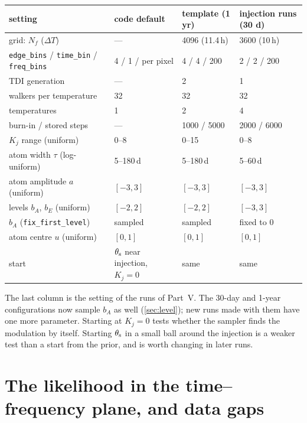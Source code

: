 \documentclass[11pt,a4paper]{article}
\begin{document}
\begin{center}
\renewcommand{\arraystretch}{1.15}
\footnotesize
\begin{tabular}{@{}llll@{}}
\toprule
setting & code default & template (1 yr) & injection runs (30 d) \\
\midrule
grid: $N_f$ ($\Delta T$) & --- & 4096 (11.4\,h) & 3600 (10\,h) \\
\texttt{edge\_bins} / \texttt{time\_bin} / \texttt{freq\_bins} & 4 / 1 / per pixel & 4 / 4 / 200 & 2 / 2 / 200 \\
TDI generation & --- & 2 & 1 \\
walkers per temperature & 32 & 32 & 32 \\
temperatures & 1 & 2 & 4 \\
burn-in / stored steps & --- & 1000 / 5000 & 2000 / 6000 \\
$K_j$ range (uniform) & 0--8 & 0--15 & 0--8 \\
atom width $\tau$ (log-uniform) & 5--180\,d & 5--180\,d & 5--60\,d \\
atom amplitude $a$ (uniform) & $[-3,3]$ & $[-3,3]$ & $[-3,3]$ \\
levels $b_A$, $b_E$ (uniform) & $[-2,2]$ & $[-2,2]$ & $[-3,3]$ \\
$b_A$ (\texttt{fix\_first\_level}) & sampled & sampled & fixed to 0 \\
atom centre $u$ (uniform) & $[0,1]$ & $[0,1]$ & $[0,1]$ \\
start & $\theta_{\rm s}$ near injection, $K_j=0$ & same & same \\
\bottomrule
\end{tabular}
\end{center}
The last column is the setting of the runs of Part~V. The 30-day and 1-year
configurations now sample $b_A$ as well (\cref{sec:level}); new runs made with them
have one more parameter. Starting at $K_j=0$ tests whether the sampler finds the
modulation by itself. Starting
$\theta_{\rm s}$ in a small ball around the injection is a weaker test than a start
from the prior, and is worth changing in later runs.

\section{The likelihood in the time--frequency plane, and data gaps}\label{sec:gaps}
\end{document}
